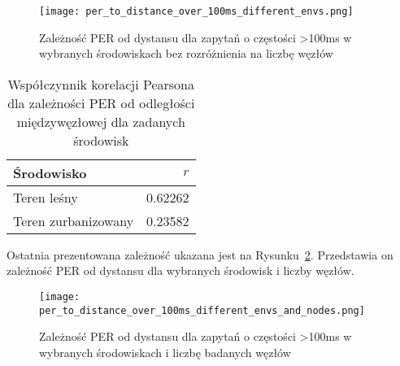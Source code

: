 \begin{figure}[!htb]
	\centering \texttt{[image: per\_to\_distance\_over\_100ms\_different\_envs.png]} 
	\caption{Zależność \gls{PER} od dystansu dla zapytań o częstości >100ms w wybranych środowiskach bez rozróżnienia na liczbę węzłów}
	\label{rys:per_to_distance_over_100ms_different_envs}
\end{figure}

\begin{table}[!ht]
\centering
	\begin{tabular}{p{4.5cm}|r}
	Środowisko              & $r$             \\\hline
	Teren leśny             & 0.62262         \\\hline
	Teren zurbanizowany     & 0.23582         \\\hline
	\end{tabular}
\caption{\label{tab:corr_between_per_and_env}Współczynnik korelacji Pearsona dla zależności PER od odległości międzywęzłowej dla zadanych środowisk}
\end{table}

Ostatnia prezentowana zależność ukazana jest na Rysunku~\ref{rys:per_to_distance_over_100ms_different_envs_and_nodes}.
Przedstawia on zależność PER od dystansu dla wybranych środowisk i liczby węzłów.

\begin{figure}[!htb]
	\centering \texttt{[image: per\_to\_distance\_over\_100ms\_different\_envs\_and\_nodes.png]}
	\caption{Zależność \gls{PER} od dystansu dla zapytań o częstości >100ms w wybranych środowiskach i liczbę badanych węzłów}
	\label{rys:per_to_distance_over_100ms_different_envs_and_nodes}
\end{figure}


